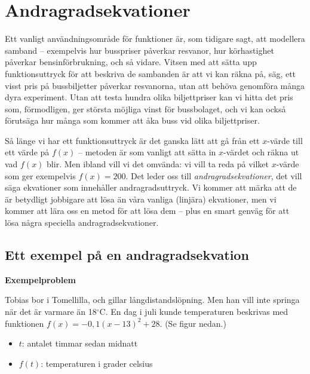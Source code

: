 \section{Andragradsekvationer}

Ett vanligt användningsområde för funktioner är, som tidigare sagt, att modellera samband -- exempelvis hur busspriser påverkar resvanor, hur körhastighet påverkar bensinförbrukning, och så vidare.
Vitsen med att sätta upp funktionsuttryck för att beskriva de sambanden är att vi kan räkna på, säg, ett visst pris på bussbiljetter påverkar resvanorna, utan att behöva genomföra många dyra experiment.
Utan att testa hundra olika biljettpriser kan vi hitta det pris som, förmodligen, ger största möjliga vinst för bussbolaget, och vi kan också förutsäga hur många som kommer att åka buss vid olika biljettpriser.

Så länge vi har ett funktionsuttryck är det ganska lätt att gå från ett $x$-värde till ett värde på $f(x)$ -- metoden är som vanligt att sätta in $x$-värdet och räkna ut vad $f(x)$ blir.
Men ibland vill vi det omvända: vi vill ta reda på vilket $x$-värde som ger exempelvis $f(x)=200$.
Det leder oss till \emph{andragradsekvationer}, det vill säga ekvationer som innehåller andragradsuttryck.
Vi kommer att märka att de är betydligt jobbigare att lösa än våra vanliga (linjära) ekvationer, men vi kommer att lära oss en metod för att lösa dem -- plus en smart genväg för att lösa några speciella andragradsekvationer.

\subsection{Ett exempel på en andragradsekvation}

\textbf{Exempelproblem}

Tobias bor i Tomellilla, och gillar långdistandslöpning. Men han vill inte springa när det är varmare än 18$^{\circ}$C.
En dag i juli kunde temperaturen beskrivas med funktionen $f(x) = -0,1(x-13)^2+28$. (Se figur nedan.)
\begin{itemize}
  \item[] $t$: antalet timmar sedan midnatt
  \item[] $f(t)$: temperaturen i grader celsius
\end{itemize}

